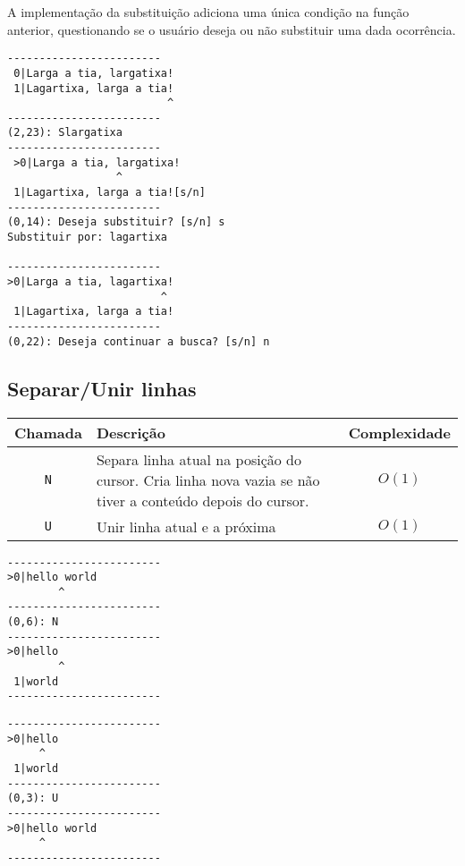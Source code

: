 \documentclass[a4paper, 11pt]{article}
\begin{document}
A implementação da substituição adiciona uma única condição na função anterior, questionando se o usuário deseja ou não substituir uma dada ocorrência.
\begin{center}
\begin{minipage}[t]{0.8\linewidth}
\begin{lstlisting}[caption={Exemplo de Substituição}, label={list_exemplo_de_substituicao}, language={[ansi]C},firstnumber=1]
------------------------
 0|Larga a tia, largatixa!
 1|Lagartixa, larga a tia!
                         ^
------------------------
(2,23): Slargatixa
------------------------
 >0|Larga a tia, largatixa!
                 ^
 1|Lagartixa, larga a tia![s/n]
------------------------
(0,14): Deseja substituir? [s/n] s
Substituir por: lagartixa

------------------------
>0|Larga a tia, lagartixa!
                        ^
 1|Lagartixa, larga a tia!
------------------------
(0,22): Deseja continuar a busca? [s/n] n
\end{lstlisting}
\end{minipage}
\end{center}

\subsection{Separar/Unir linhas}

\begin{table}[H]
      \centering
      \begin{tabularx}{\linewidth}{|c|X|c|}
      \hline
      \textbf{Chamada} & \textbf{Descrição} & \textbf{Complexidade}
      \\ 
      \hline
      \texttt{N} & Separa linha atual na posição do cursor. Cria linha nova vazia se não tiver a conteúdo depois do cursor. & $O(1)$ \\
      \texttt{U} & Unir linha atual e a próxima & $O(1)$ \\
      \hline
      \end{tabularx}
\end{table}

\begin{center}
      \begin{minipage}[t]{0.45\linewidth}
            \begin{lstlisting}[caption={Quebra de linha}, label={list_exemplo_de_quebra}, language={[ansi]C},firstnumber=1]
------------------------
>0|hello world
        ^
------------------------
(0,6): N
------------------------
>0|hello 
        ^
 1|world
------------------------
            \end{lstlisting}
      \end{minipage}
      \quad
      \begin{minipage}[t]{0.45\linewidth}
            \begin{lstlisting}[caption={União de linha}, label={list_exemplo_de_uniao}, language={[ansi]C},firstnumber=1]
------------------------
>0|hello
     ^
 1|world
------------------------
(0,3): U
------------------------
>0|hello world
     ^
------------------------
            \end{lstlisting}
      \end{minipage}
\end{center}
\end{document}
